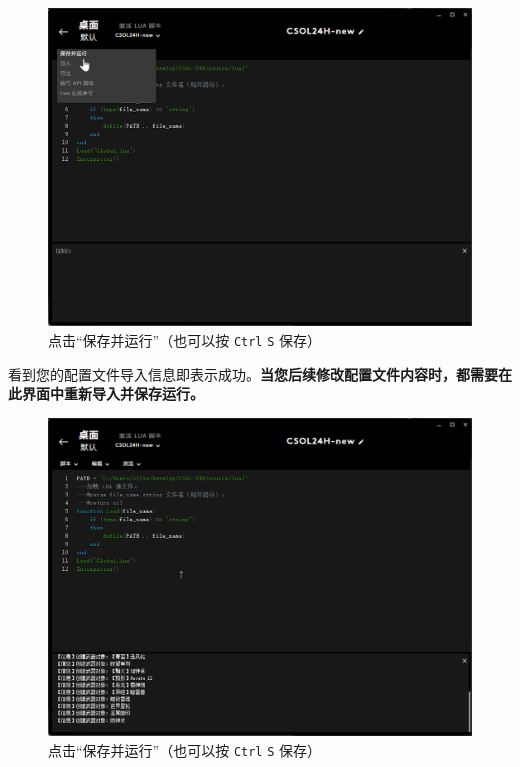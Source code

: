 \begin{figure}[H]
    \Centering
    \includegraphics[width=\textwidth]{docs/assets/update/save_and_run_00.png}
    \caption{点击“保存并运行”（也可以按 \lstinline{Ctrl} \lstinline{S} 保存）}
\end{figure}

看到您的配置文件导入信息即表示成功。\textbf{\color{red}当您后续修改配置文件内容时，都需要在此界面中重新导入并保存运行。}

\begin{figure}[H]
    \Centering
    \includegraphics[width=\textwidth]{docs/assets/update/save_and_run_01.png}
    \caption{点击“保存并运行”（也可以按 \lstinline{Ctrl} \lstinline{S} 保存）}
\end{figure}

